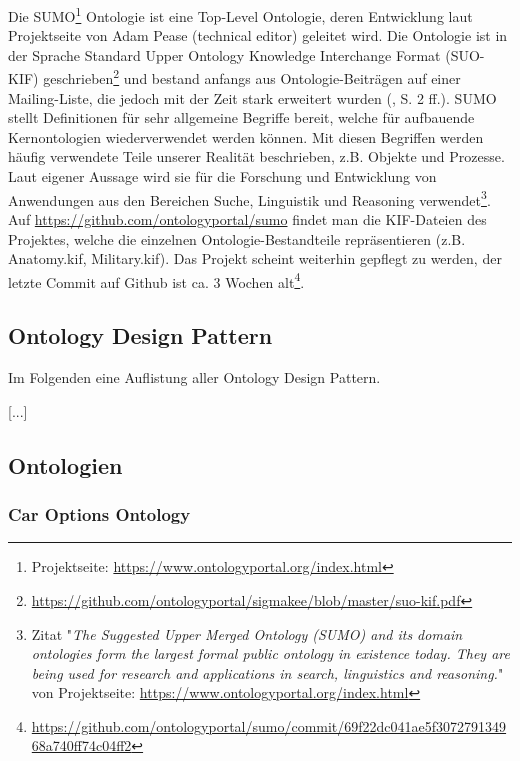 \documentclass{article}
\begin{document}
Die SUMO\footnote{Projektseite: \url{https://www.ontologyportal.org/index.html}} Ontologie ist eine Top-Level Ontologie, deren Entwicklung laut Projektseite von Adam Pease (technical editor) geleitet wird.
Die Ontologie ist in der Sprache Standard Upper Ontology Knowledge Interchange Format (SUO-KIF) geschrieben\footnote{\url{https://github.com/ontologyportal/sigmakee/blob/master/suo-kif.pdf}} und
bestand anfangs aus Ontologie-Beiträgen auf einer Mailing-Liste, die jedoch mit der Zeit stark erweitert wurden (\cite{niles2001towards}, S. 2 ff.).
SUMO stellt Definitionen für sehr allgemeine Begriffe bereit, welche für aufbauende Kernontologien wiederverwendet werden können.
Mit diesen Begriffen werden häufig verwendete Teile unserer Realität beschrieben, z.B. Objekte und Prozesse.
Laut eigener Aussage wird sie für die Forschung und Entwicklung von Anwendungen aus den Bereichen Suche, Linguistik und Reasoning verwendet\footnote{Zitat "\textit{The Suggested Upper Merged Ontology (SUMO) and its domain ontologies form the largest formal public ontology in existence today. They are being used for research and applications in search, linguistics and reasoning.}" von Projektseite: \url{https://www.ontologyportal.org/index.html}}.
Auf \url{https://github.com/ontologyportal/sumo} findet man die KIF-Dateien des Projektes, welche die einzelnen Ontologie-Bestandteile repräsentieren (z.B. Anatomy.kif, Military.kif).
Das Projekt scheint weiterhin gepflegt zu werden, der letzte Commit auf Github ist ca. 3 Wochen alt\footnote{\url{https://github.com/ontologyportal/sumo/commit/69f22dc041ae5f307279134968a740ff74c04ff2}}.

\subsection{Ontology Design Pattern}

Im Folgenden eine Auflistung aller Ontology Design Pattern.

[...]

\subsection{Ontologien}


\subsubsection{Car Options Ontology}
\end{document}
